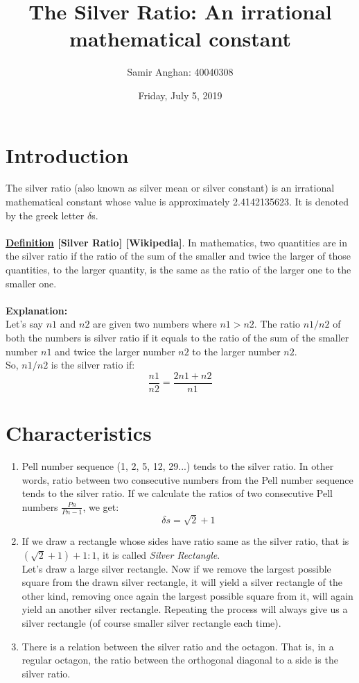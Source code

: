 \documentclass[letterpaper]{article}
\title{The Silver Ratio: An irrational mathematical constant}
\author{Samir Anghan: 40040308}
\date{Friday, July 5, 2019}
\begin{document}
\maketitle

\section{Introduction}
The silver ratio (also known as silver mean or silver constant) is an irrational mathematical constant whose value is approximately 2.4142135623. It is denoted by the greek letter $\delta$s. \\ \\
\textbf{\underline{Definition} [Silver Ratio] [Wikipedia]}. In mathematics, two quantities are in the silver ratio if the ratio of the sum of the smaller and twice the larger of those quantities, to the larger quantity, is the same as the ratio of the larger one to the smaller one. \\ \\
\textbf{Explanation:} \\
Let's say $n1$ and $n2$ are given two numbers where $ n1 > n2 $. The ratio $n1/n2$ of both the numbers is silver ratio if it equals to the ratio of the sum of the smaller number $n1$ and twice the larger number $n2$ to the larger number $n2$. \\
So, $n1/n2$ is the silver ratio if: \\

\[\frac{n1}{n2}=\frac{2n1 + n2}{n1} \]
\section{Characteristics}
\begin{enumerate}
  \item Pell number sequence (1, 2, 5, 12, 29...) tends to the silver ratio. In other words, ratio between two consecutive numbers from the Pell number sequence tends to the silver ratio. If we calculate the ratios of two consecutive Pell numbers \( \frac{Pn}{Pn-1} \), we get:
  \[  \delta s = \sqrt{2} + 1 \]
  
  \item If we draw a rectangle whose sides have ratio same as the silver ratio, that is \( (\sqrt{2} + 1) + 1 : 1\), it is called \emph{Silver Rectangle}. \\
Let's draw a large silver rectangle. Now if we remove the largest possible square from the drawn silver rectangle, it will yield a silver rectangle of the other kind, removing once again the largest possible square from it, will again yield an another silver rectangle. Repeating the process will always give us a silver rectangle (of course smaller silver rectangle each time).

 \item There is a relation between the silver ratio and the octagon. That is, in a regular octagon, the ratio between the orthogonal diagonal to a side is the silver ratio.
\end{enumerate}
\end{document}

